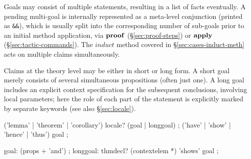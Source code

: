 Goals may consist of multiple statements, resulting in a list of facts
eventually.  A pending multi-goal is internally represented as a meta-level
conjunction (printed as \verb,&&,), which is usually split into the
corresponding number of sub-goals prior to an initial method application, via
${\mathord{\mathbf{proof}}}$ (\S\ref{sec:proof-steps}) or ${\mathord{\mathbf{apply}}}$
(\S\ref{sec:tactic-commands}).  The $induct$ method covered in
\S\ref{sec:cases-induct-meth} acts on multiple claims simultaneously.

Claims at the theory level may be either in short or long form.  A short goal
merely consists of several simultaneous propositions (often just one).  A long
goal includes an explicit context specification for the subsequent
conclusions, involving local parameters; here the role of each part of the
statement is explicitly marked by separate keywords (see also
\S\ref{sec:locale}).

\begin{rail}
  ('lemma' | 'theorem' | 'corollary') locale? (goal | longgoal)
  ;
  ('have' | 'show' | 'hence' | 'thus') goal
  ;
  
  goal: (props + 'and')
  ;
  longgoal: thmdecl? (contextelem *) 'shows' goal
  ;
\end{rail}

